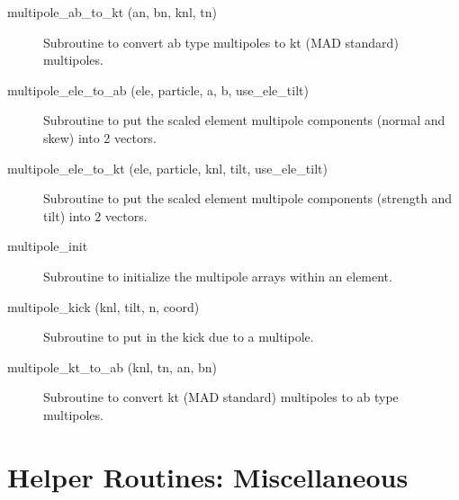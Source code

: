 \begin{description}

\item[multipole\_ab\_to\_kt (an, bn, knl, tn)] \Newline
Subroutine to convert ab type multipoles to kt (MAD standard) multipoles. 

\item[multipole\_ele\_to\_ab (ele, particle, a, b, use\_ele\_tilt)] \Newline
Subroutine to put the scaled element multipole components (normal and skew) into 2 vectors. 

\item[multipole\_ele\_to\_kt (ele, particle, knl, tilt, use\_ele\_tilt)] \Newline
Subroutine to put the scaled element multipole components (strength and tilt) 
into 2 vectors. 

\item[multipole\_init] \Newline
Subroutine to initialize the multipole arrays within an element.

\item[multipole\_kick (knl, tilt, n, coord)] \Newline
Subroutine to put in the kick due to a multipole. 

\item[multipole\_kt\_to\_ab (knl, tn, an, bn)] \Newline
Subroutine to convert kt (MAD standard) multipoles to ab type multipoles. 

\end{description}

\section{Helper Routines: Miscellaneous}
\label{r:misc_help}

